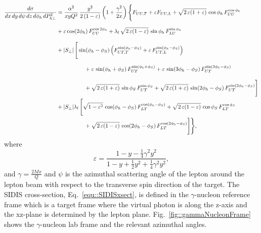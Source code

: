 \begin{align}
  \frac{d\sigma}{dx \, dy\, d\psi \,dz\, d\phi_h\, d P_{h\perp}^2} &=
  \frac{\alpha^2}{x y Q^2}\,
  \frac{y^2}{2\,(1-\varepsilon)}\,  \biggl( 1+\frac{\gamma^2}{2x} \biggr)\,
  \Biggl\{
  F_{UU ,T}
  + 
  \varepsilon
  F_{UU ,L}
  + \sqrt{2\,\varepsilon (1+\varepsilon)}\,\cos\phi_h\,
  F_{UU}^{\cos\phi_h}
  \nonumber \\  & 
  + \varepsilon \cos(2\phi_h)\, 
  F_{UU}^{\cos 2\phi_h}
  + \lambda_l\, \sqrt{2\,\varepsilon (1-\varepsilon)}\, 
  \sin\phi_h\, 
  F_{LU}^{\sin\phi_h}
  \phantom{\Bigg[ \Bigg] }
  \nonumber \\  & 
  + |S_\perp|\, \Bigg[
    \sin(\phi_h-\phi_S)\,
    \Bigl(F_{UT ,T}^{\sin\left(\phi_h -\phi_S\right)}
    + \varepsilon\, F_{UT ,L}^{\sin\left(\phi_h -\phi_S\right)}\Bigr)
    \nonumber \\  & \quad  \qquad \qquad
    + \varepsilon\, \sin(\phi_h+\phi_S)\, 
    F_{UT}^{\sin\left(\phi_h +\phi_S\right)}
    + \varepsilon\, \sin(3\phi_h-\phi_S)\,
    F_{UT}^{\sin\left(3\phi_h -\phi_S\right)}
    \phantom{\Bigg[ \Bigg] }
    \nonumber \\  & \quad \qquad \qquad
    + \sqrt{2\,\varepsilon (1+\varepsilon)}\, 
    \sin\phi_S\, 
    F_{UT}^{\sin \phi_S }
    + \sqrt{2\,\varepsilon (1+\varepsilon)}\, 
    \sin(2\phi_h-\phi_S)\,  
    F_{UT}^{\sin\left(2\phi_h -\phi_S\right)}
    \Bigg]
  \nonumber \\  &
  + |S_\perp| \lambda_l\, \Bigg[
    \sqrt{1-\varepsilon^2}\, \cos(\phi_h-\phi_S)\, 
    F_{LT}^{\cos(\phi_h -\phi_S)}
    +\sqrt{2\,\varepsilon (1-\varepsilon)}\, 
    \cos\phi_S\, 
    F_{LT}^{\cos \phi_S}
    \nonumber \\  & \quad \qquad \qquad
    +\sqrt{2\,\varepsilon (1-\varepsilon)}\, 
    \cos(2\phi_h-\phi_S)\,  
    F_{LT}^{\cos(2\phi_h - \phi_S)}
    \Bigg] \Biggr\},
  \label{equ::SIDISxsect}
\end{align}
\noindent
where
\begin{equation}
  \varepsilon =
  \frac{1-y-\frac{1}{4}\gamma^2y^2}{1-y+\frac{1}{2}y^2+\frac{1}{4}\gamma^2y^2},
\end{equation}
\noindent
and $\gamma = \frac{2Mx}{Q}$ and $\psi$ is the azimuthal scattering angle of the
lepton around the lepton beam with respect to the transverse spin direction of
the target.  The SIDIS cross-section, Eq.~\ref{equ::SIDISxsect}, is defined in
the $\gamma$-nucleon reference frame which is a target frame where the virtual
photon is along the z-axis and the xz-plane is determined by the lepton plane.
Fig.~\ref{fig::gammaNucleonFrame} shows the $\gamma$-nucleon lab frame and the
relevant azimuthal angles.

